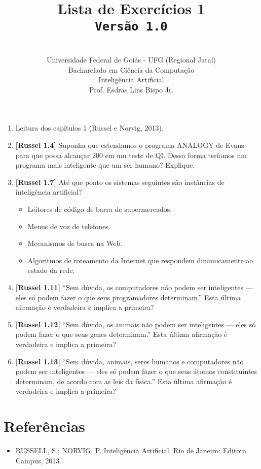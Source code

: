 \documentclass[12pt,a4paper,oneside]{article}
\author{\\Universidade Federal de Goiás - UFG (Regional Jataí) \\Bacharelado em Ciência da Computação \\Inteligência Artificial \\Prof. Esdras Lins Bispo Jr.}
\title{
	{\sc \huge Lista de Exercícios 1} 
	\\{\tt Versão 1.0}
}
\begin{document}
\maketitle

\begin{enumerate}

	\item Leitura dos capítulos 1 (Russel e Norvig, 2013).
	
	\item {\bf [Russel 1.4]} Suponha que estendamos o programa ANALOGY de Evans para que possa alcançar 200 em um
teste de QI. Dessa forma teríamos um programa mais inteligente que um ser humano? Explique.	

	\item {\bf [Russel 1.7]} Até que ponto os sistemas seguintes são instâncias de inteligência artificial?
 		\begin{itemize}
 			\item Leitores de código de barra de supermercados.
			\item Menus de voz de telefones.
			\item Mecanismos de busca na Web.
			\item Algoritmos de roteamento da Internet que respondem dinamicamente ao estado da rede.
		\end{itemize}
	
	\item {\bf [Russel 1.11]} ``Sem dúvida, os computadores não podem ser inteligentes — eles só podem fazer o que seus programadores determinam.'' Esta última afirmação é verdadeira e implica a primeira?
	
	\item {\bf [Russel 1.12]} ``Sem dúvida, os animais não podem ser inteligentes — eles só podem fazer o que seus genes determinam.'' Esta última afirmação é verdadeira e implica a primeira?
	
	\item {\bf [Russel 1.13]} ``Sem dúvida, animais, seres humanos e computadores não podem ser inteligentes — eles só podem fazer o que seus átomos constituintes determinam, de acordo com as leis da física.'' Esta
última afirmação é verdadeira e implica a primeira?	
		
\end{enumerate}

\section{Referências}

\begin{itemize}
	\item RUSSELL, S.; NORVIG, P. Inteligência Artificial. Rio de Janeiro: Editora Campus, 2013.
\end{itemize}
\end{document}
